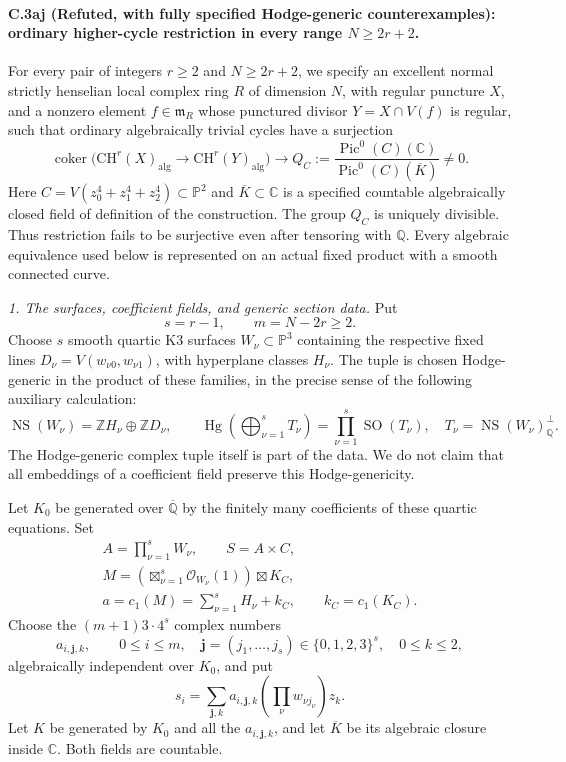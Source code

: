 \paragraph{C.3aj (Refuted, with fully specified Hodge-generic counterexamples): ordinary higher-cycle restriction in every range $N\ge 2r+2$.}
For every pair of integers $r\ge2$ and $N\ge2r+2$, we specify
an excellent normal strictly henselian local complex ring $R$ of
dimension $N$, with regular puncture $X$, and a nonzero element
$f\in\mathfrak m_R$ whose punctured divisor $Y=X\cap V(f)$ is
regular, such that ordinary algebraically trivial cycles have a
surjection
\[
 \operatorname{coker}\bigl(
 \mathrm{CH}^r(X)_{\mathrm{alg}}\longrightarrow
 \mathrm{CH}^r(Y)_{\mathrm{alg}}\bigr)
 \longrightarrow
 Q_C:=\frac{\operatorname{Pic}^0(C)(\mathbb C)}
                  {\operatorname{Pic}^0(C)(\overline K)}\ne0.
\]
Here $C=V(z_0^4+z_1^4+z_2^4)\subset\mathbb P^2$ and
$\overline K\subset\mathbb C$ is a specified countable algebraically
closed field of definition of the construction. The group $Q_C$ is
uniquely divisible. Thus restriction fails to be surjective even
after tensoring with $\mathbb Q$. Every algebraic equivalence used
below is represented on an actual fixed product with a smooth
connected curve.

\emph{1. The surfaces, coefficient fields, and generic section data.}
Put
\[
 s=r-1,\qquad m=N-2r\ge2.
\]
Choose $s$ smooth quartic K3 surfaces $W_\nu\subset\mathbb P^3$
containing the respective fixed lines
$D_\nu=V(w_{\nu0},w_{\nu1})$, with hyperplane classes $H_\nu$.
The tuple is chosen Hodge-generic in the product of these families,
in the precise sense of the following auxiliary calculation:
\[
 \operatorname{NS}(W_\nu)=\mathbb ZH_\nu\oplus\mathbb ZD_\nu,
 \qquad
 \operatorname{Hg}\left(\bigoplus_{\nu=1}^s T_\nu\right)
       =\prod_{\nu=1}^s\operatorname{SO}(T_\nu),
 \quad
 T_\nu=\operatorname{NS}(W_\nu)_{\mathbb Q}^{\perp}.
\]
The Hodge-generic complex tuple itself is part of the data. We
do not claim that all embeddings of a coefficient field preserve
this Hodge-genericity.



Let $K_0$ be generated over $\overline{\mathbb Q}$ by the finitely
many coefficients of these quartic equations. Set
\[
 \begin{gathered}
 A=\prod_{\nu=1}^s W_\nu,\qquad S=A\times C,\\
 M=\left(\boxtimes_{\nu=1}^s\mathcal O_{W_\nu}(1)\right)
                        \boxtimes K_C,\\
 a=c_1(M)=\sum_{\nu=1}^s H_\nu+k_C,
 \qquad k_C=c_1(K_C).
 \end{gathered}
\]
Choose the $(m+1)3\cdot4^s$ complex numbers
\[
 a_{i,\mathbf j,k},\qquad
 0\le i\le m,\quad\mathbf j=(j_1,\ldots,j_s)\in\{0,1,2,3\}^s,
 \quad 0\le k\le2,
\]
algebraically independent over $K_0$, and put
\[
 s_i=\sum_{\mathbf j,k}a_{i,\mathbf j,k}
                 \left(\prod_\nu w_{\nu j_\nu}\right)z_k.
\]
Let $K$ be generated by $K_0$ and
all the $a_{i,\mathbf j,k}$, and let $\overline K$ be its algebraic
closure inside $\mathbb C$. Both fields are countable.

